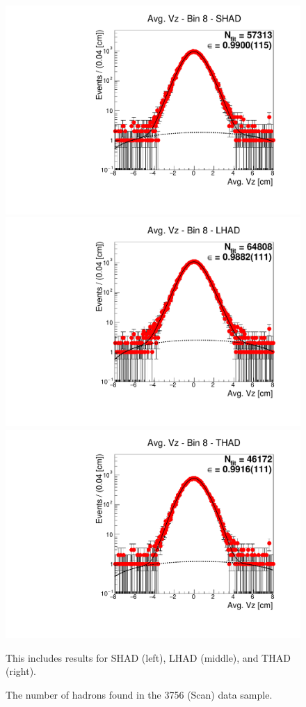 \begin{figure}[H]
\centering
\includegraphics[scale=0.25]{figures/plots/nonDDbar_fit_results/scan/fit_scan_08_data_SHAD.pdf}
\hspace{-0.5cm}
\includegraphics[scale=0.25]{figures/plots/nonDDbar_fit_results/scan/fit_scan_08_data_LHAD.pdf}
\hspace{-0.5cm}
\includegraphics[scale=0.25]{figures/plots/nonDDbar_fit_results/scan/fit_scan_08_data_THAD.pdf}
\caption{The number of hadrons found in the 3756 (Scan) data sample.}
{This includes results for SHAD (left), LHAD (middle), and THAD (right).}
\label{fig:hadron_fits_scan_08}
\end{figure}

